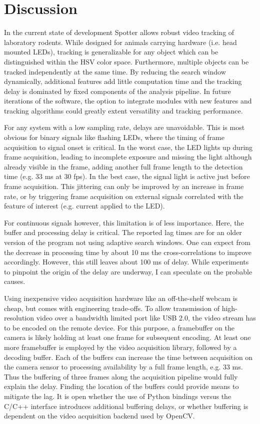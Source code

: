 \section{Discussion}
\label{sec:discussion}
In the current state of development Spotter allows robust video tracking of laboratory rodents. While designed for animals carrying hardware (i.e. head mounted LEDs), tracking is generalizable for any object which can be distinguished within the HSV color space. Furthermore, multiple objects can be tracked independently at the same time. By reducing the search window dynamically, additional features add little computation time and the tracking delay is dominated by fixed components of the analysis pipeline. In future iterations of the software, the option to integrate modules with new features and tracking algorithms could greatly extent versatility and tracking performance.

For any system with a low sampling rate, delays are unavoidable. This is most obvious for binary signals like flashing LEDs, where the timing of frame acquisition to signal onset is critical. In the worst case, the LED lights up during frame acquisition, leading to incomplete exposure and missing the light although already visible in the frame, adding another full frame length to the detection time (e.g. 33 ms at 30 fps). In the best case, the signal light is active just before frame acquisition. This jittering can only be improved by an increase in frame rate, or by triggering frame acquisition on external signals correlated with the feature of interest (e.g. current applied to the LED).

For continuous signals however, this limitation is of less importance. Here, the buffer and processing delay is critical. The reported lag times are for an older version of the program not using adaptive search windows. One can expect from the decrease in processing time by about 10 ms the cross-correlations to improve accordingly. However, this still leaves about 100 ms of delay. While experiments to pinpoint the origin of the delay are underway, I can speculate on the probable causes.

Using inexpensive video acquisition hardware like an off-the-shelf webcam is cheap, but comes with engineering trade-offs. To allow transmission of high-resolution video over a bandwidth limited port like USB 2.0, the video stream has to be encoded on the remote device. For this purpose, a framebuffer on the camera is likely holding at least one frame for subsequent encoding. At least one more framebuffer is employed by the video acquisition library, followed by a decoding buffer. Each of the buffers can increase the time between acquisition on the camera sensor to processing availability by a full frame length, e.g. 33 ms. Thus the buffering of three frames along the acquisition pipeline would fully explain the delay. Finding the location of the buffers could provide means to mitigate the lag. It is open whether the use of Python bindings versus the C/C++ interface introduces additional buffering delays, or whether buffering is dependent on the video acquisition backend used by OpenCV.  

